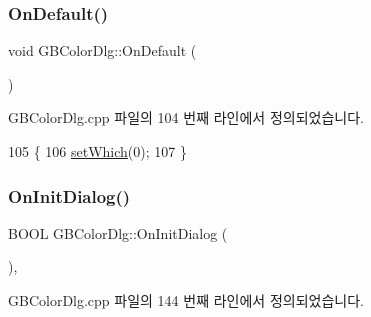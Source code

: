 \subsubsection{\texorpdfstring{On\+Default()}{OnDefault()}}
{\footnotesize\ttfamily void G\+B\+Color\+Dlg\+::\+On\+Default (\begin{DoxyParamCaption}{ }\end{DoxyParamCaption})\hspace{0.3cm}{\ttfamily [protected]}}



G\+B\+Color\+Dlg.\+cpp 파일의 104 번째 라인에서 정의되었습니다.


\begin{DoxyCode}
105 \{
106   \mbox{\hyperlink{class_g_b_color_dlg_a1e00eaaeaf344a830f1dd5692e26af1d}{setWhich}}(0);  
107 \}
\end{DoxyCode}
\mbox{\label{class_g_b_color_dlg_a376d61164a4ef4b8a60a0a3297e5470e}} 
\subsubsection{\texorpdfstring{On\+Init\+Dialog()}{OnInitDialog()}}
{\footnotesize\ttfamily B\+O\+OL G\+B\+Color\+Dlg\+::\+On\+Init\+Dialog (\begin{DoxyParamCaption}{ }\end{DoxyParamCaption})\hspace{0.3cm}{\ttfamily [protected]}, {\ttfamily [virtual]}}



G\+B\+Color\+Dlg.\+cpp 파일의 144 번째 라인에서 정의되었습니다.


